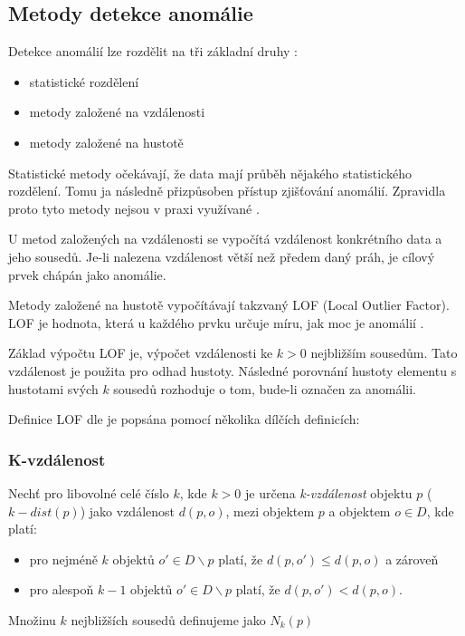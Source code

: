 \documentclass[thesis=M,czech]{FITthesis}[2012/10/20]
\begin{document}
		\subsection{Metody detekce anomálie}
			Detekce anomálií lze rozdělit na tři základní druhy \cite{KumarPCAANom}: 
			\begin{itemize} 
				\item statistické rozdělení
				\item metody založené na vzdálenosti 
				\item metody založené na hustotě		
			\end{itemize}
		
			Statistické metody očekávají, že data mají průběh nějakého statistického rozdělení. Tomu ja následně přizpůsoben přístup zjišťování anomálií. Zpravidla proto tyto metody nejsou v praxi využívané \cite{KumarPCAANom}.
			
			U metod založených na vzdálenosti se vypočítá vzdálenost konkrétního data a jeho sousedů. Je-li nalezena vzdálenost větší než předem daný práh, je cílový prvek chápán jako anomálie.
			
			Metody založené na hustotě vypočítávají takzvaný LOF (Local Outlier Factor). LOF je hodnota, která u každého prvku určuje míru, jak moc je anomálií \cite{LOF}.
			
			Základ výpočtu LOF je, výpočet vzdálenosti ke $k > 0$ nejbližším sousedům. Tato vzdálenost je použita pro odhad hustoty. Následné porovnání hustoty elementu s hustotami svých $k$ sousedů rozhoduje o tom, bude-li označen za anomálii.
			
			Definice LOF dle \cite{LOF} je popsána pomocí několika dílčích definicích: 
			
			\subsubsection{K-vzdálenost}
				Nechť pro libovolné celé číslo $k$, kde $k > 0$ je určena \textit{k-vzdálenost} objektu $p$ ($k-dist(p)$) jako vzdálenost $d(p, o)$, mezi objektem $p$ a objektem $o \in D$, kde platí:
			
				\begin{itemize} 
					\item pro nejméně $k$ objektů $o' \in D \backslash {p}$	platí, že $d(p, o') \leq d(p, o)$ a zároveň
					\item pro alespoň $k-1$ objektů $o' \in D \backslash {p}$ platí, že $d(p, o') < d(p, o)$.
				\end{itemize}
				Množinu $k$ nejbližších sousedů definujeme jako $N_k(p)$
		
\end{document}
